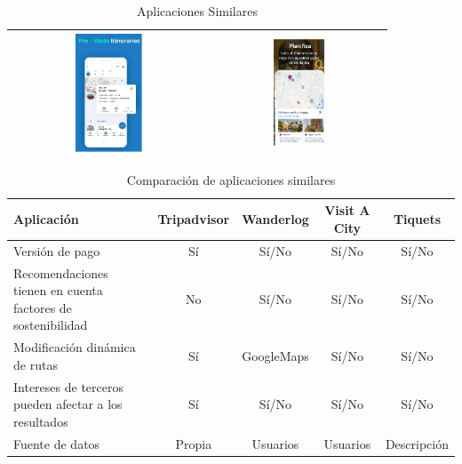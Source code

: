 \begin{table}[h!]
\begin{tabular}{cc}
	\includegraphics[width=0.35\textwidth]{img/visit_a_city.png} & \includegraphics[width=0.31\textwidth]{img/tiquets.png} \\
	\hline
	\end{tabular}
	\caption{Aplicaciones Similares}
	\label{fig:apps_similares}
	\end{table}

\newpage

\begin{table}[h]
	\centering
	\renewcommand{\arraystretch}{1.5} %
	\begin{tabular}{m{3.8cm} c c c c} %
	\toprule
	\textbf{Aplicación} & \textbf{Tripadvisor} & \textbf{Wanderlog} & \textbf{Visit A City} & \textbf{Tiquets} \\
	\midrule
	Versión de pago & Sí & Sí/No & Sí/No & Sí/No \\
	Recomendaciones tienen en cuenta factores de sostenibilidad & No & Sí/No & Sí/No & Sí/No \\
	Modificación dinámica de rutas & Sí & GoogleMaps & Sí/No & Sí/No \\
	Intereses de terceros pueden afectar a los resultados & Sí & Sí/No & Sí/No & Sí/No \\
	Fuente de datos & Propia & Usuarios & Usuarios & Descripción \\
	\bottomrule
	\end{tabular}
	\caption{Comparación de aplicaciones similares} %
	\label{herramientasportipodeuso}
	\end{table}